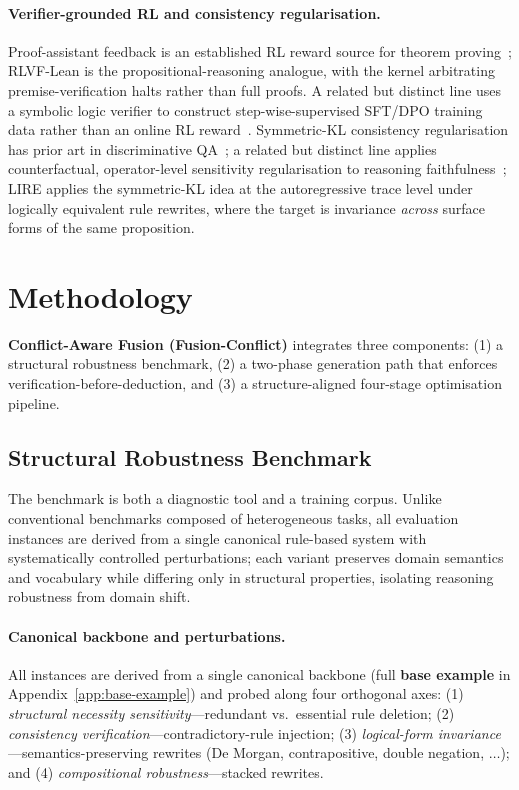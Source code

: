 \documentclass{article}
\begin{document}
\paragraph{Verifier-grounded RL and consistency regularisation.}
Proof-assistant feedback is an established RL reward source for theorem proving~\citep{deepseekprover2024,leanabell2025,alphaproof2024}; RLVF-Lean is the propositional-reasoning analogue, with the kernel arbitrating premise-verification halts rather than full proofs. A related but distinct line uses a symbolic logic verifier to construct step-wise-supervised SFT/DPO training data rather than an online RL reward~\citep{logicReward2025}. Symmetric-KL consistency regularisation has prior art in discriminative QA~\citep{asai2020logicaug,li2019logicconsistency}; a related but distinct line applies counterfactual, operator-level sensitivity regularisation to reasoning faithfulness~\citep{causalConsistency2026}; LIRE applies the symmetric-KL idea at the autoregressive trace level under logically equivalent rule rewrites, where the target is invariance \emph{across} surface forms of the same proposition.

\section{Methodology}
\label{sec:method}
\textbf{Conflict-Aware Fusion (Fusion-Conflict)} integrates three components: (1) a structural robustness benchmark, (2) a two-phase generation path that enforces verification-before-deduction, and (3) a structure-aligned four-stage optimisation pipeline.

\subsection{Structural Robustness Benchmark}

The benchmark is both a diagnostic tool and a training corpus. Unlike conventional benchmarks composed of heterogeneous tasks, all evaluation instances are derived from a single canonical rule-based system with systematically controlled perturbations; each variant preserves domain semantics and vocabulary while differing only in structural properties, isolating reasoning robustness from domain shift.

\paragraph{Canonical backbone and perturbations.}
All instances are derived from a single canonical backbone (full \textbf{base example} in Appendix~\ref{app:base-example}) and probed along four orthogonal axes: (1) \emph{structural necessity sensitivity}---redundant vs.\ essential rule deletion; (2) \emph{consistency verification}---contradictory-rule injection; (3) \emph{logical-form invariance}---semantics-preserving rewrites (De Morgan, contrapositive, double negation, $\ldots$); and (4) \emph{compositional robustness}---stacked rewrites.
\end{document}
